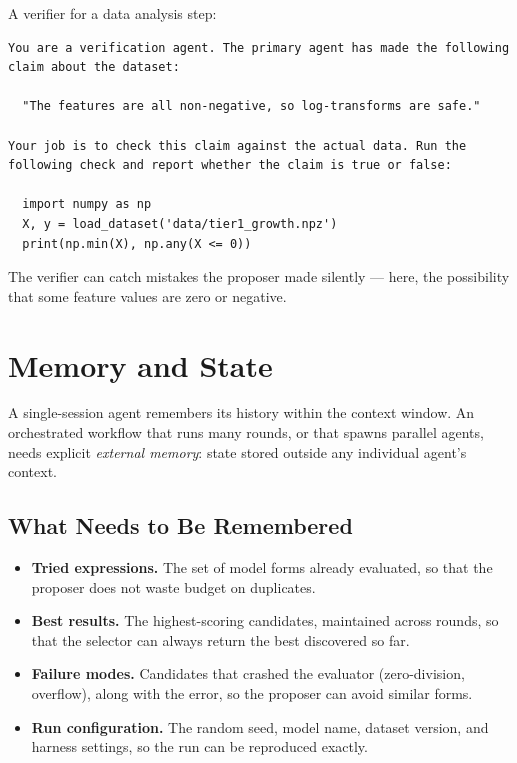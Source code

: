 \begin{example}
A verifier for a data analysis step:
\begin{lstlisting}[language=markdown]
You are a verification agent. The primary agent has made the following
claim about the dataset:

  "The features are all non-negative, so log-transforms are safe."

Your job is to check this claim against the actual data. Run the
following check and report whether the claim is true or false:

  import numpy as np
  X, y = load_dataset('data/tier1_growth.npz')
  print(np.min(X), np.any(X <= 0))
\end{lstlisting}
The verifier can catch mistakes the proposer made silently — here, the possibility that some feature values are zero or negative.
\end{example}

\section{Memory and State}
\label{section:MemoryState}

A single-session agent remembers its history within the context window.
An orchestrated workflow that runs many rounds, or that spawns parallel agents, needs explicit \emph{external memory}: state stored outside any individual agent's context.

\subsection{What Needs to Be Remembered}

\begin{itemize}
\item \textbf{Tried expressions.} The set of model forms already evaluated, so that the proposer does not waste budget on duplicates.
\item \textbf{Best results.} The highest-scoring candidates, maintained across rounds, so that the selector can always return the best discovered so far.
\item \textbf{Failure modes.} Candidates that crashed the evaluator (zero-division, overflow), along with the error, so the proposer can avoid similar forms.
\item \textbf{Run configuration.} The random seed, model name, dataset version, and harness settings, so the run can be reproduced exactly.
\end{itemize}

